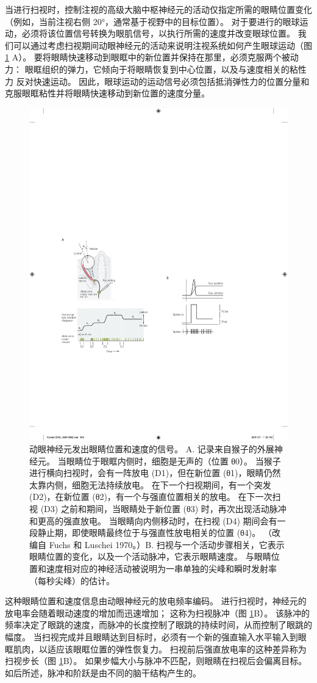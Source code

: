 当进行扫视时，控制注视的高级大脑中枢神经元的活动仅指定所需的眼睛位置变化（例如，当前注视右侧 20°，通常基于视野中的目标位置）。
对于要进行的眼球运动，必须将该位置信号转换为眼肌信号，以执行所需的速度并改变眼球位置。
我们可以通过考虑扫视期间动眼神经元的活动来说明注视系统如何产生眼球运动（图 \ref{fig:35_7} A）。 
要将眼睛快速移动到眼眶中的新位置并保持在那里，必须克服两个被动力：
眼眶组织的弹力，它倾向于将眼睛恢复到中心位置，以及与速度相关的粘性力 反对快速运动。
因此，眼球运动的运动信号必须包括抵消弹性力的位置分量和克服眼眶粘性并将眼睛快速移动到新位置的速度分量。


\begin{figure}[htbp]
	\centering
	\includegraphics[width=0.5\linewidth]{chap35/fig_35_7}
	\caption{动眼神经元发出眼睛位置和速度的信号。 A. 记录来自猴子的外展神经元。 当眼睛位于眼眶内侧时，细胞是无声的（位置 θ0）。 当猴子进行横向扫视时，会有一阵放电 (D1)，但在新位置 (θ1)，眼睛仍然太靠内侧，细胞无法持续放电。 在下一个扫视期间，有一个突发 (D2)，在新位置 (θ2)，有一个与强直位置相关的放电。 在下一次扫视 (D3) 之前和期间，当眼睛处于新位置 (θ3) 时，再次出现活动脉冲和更高的强直放电。 当眼睛向内侧移动时，在扫视 (D4) 期间会有一段静止期，即使眼睛最终位于与强直性放电相关的位置 (θ4)。 （改编自 Fuchs 和 Luschei 1970。）B. 扫视与一个活动步骤相关，它表示眼睛位置的变化，以及一个活动脉冲，它表示眼睛速度。 与眼睛位置和速度相对应的神经活动被说明为一串单独的尖峰和瞬时发射率（每秒尖峰）的估计。}
	\label{fig:35_7}
\end{figure}


这种眼睛位置和速度信息由动眼神经元的放电频率编码。
进行扫视时，神经元的放电率会随着眼动速度的增加而迅速增加； 这称为扫视脉冲（图 \ref{fig:35_7}B）。
该脉冲的频率决定了眼跳的速度，而脉冲的长度控制了眼跳的持续时间，从而控制了眼跳的幅度。
当扫视完成并且眼睛达到目标时，必须有一个新的强直输入水平输入到眼眶肌肉，以适应该眼眶位置的弹性恢复力。
扫视前后强直放电率的这种差异称为扫视步长（图 \ref{fig:35_7}B）。
如果步幅大小与脉冲不匹配，则眼睛在扫视后会偏离目标。
如后所述，脉冲和阶跃是由不同的脑干结构产生的。


